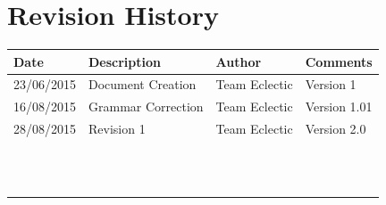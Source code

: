 \documentclass[11pt]{article}
\begin{document}


\setcounter{tocdepth}{3}
\setcounter{secnumdepth}{5}
\tableofcontents

\newpage
\section{Revision History}
\begin{table}[h]
\begin{tabular}{llll}
\textbf{Date}          & \textbf{Description}  & \textbf{Author}       & \textbf{Comments}   \\ \hline
\multicolumn{1}{|R{2cm}|}{23/06/2015} & \multicolumn{1}{L{4.5cm}|}{Document Creation} & \multicolumn{1}{l|}{Team Eclectic} & \multicolumn{1}{L{4cm}|}{Version 1} \\ \hline
\multicolumn{1}{|R{2cm}|}{16/08/2015} & \multicolumn{1}{L{4.5cm}|}{Grammar Correction} & \multicolumn{1}{l|}{Team Eclectic} & \multicolumn{1}{L{4cm}|}{Version 1.01} \\ \hline
\multicolumn{1}{|R{2cm}|}{28/08/2015} & \multicolumn{1}{L{4.5cm}|}{Revision 1} & \multicolumn{1}{l|}{Team Eclectic} & \multicolumn{1}{L{4cm}|}{Version 2.0} \\ \hline
\multicolumn{1}{|l|}{} & \multicolumn{1}{l|}{} & \multicolumn{1}{l|}{} & \multicolumn{1}{l|}{} \\ \hline
\multicolumn{1}{|l|}{} & \multicolumn{1}{l|}{} & \multicolumn{1}{l|}{} & \multicolumn{1}{l|}{} \\ \hline
\multicolumn{1}{|l|}{} & \multicolumn{1}{l|}{} & \multicolumn{1}{l|}{} & \multicolumn{1}{l|}{} \\ \hline
\multicolumn{1}{|l|}{} & \multicolumn{1}{l|}{} & \multicolumn{1}{l|}{} & \multicolumn{1}{l|}{} \\ \hline
\multicolumn{1}{|l|}{} & \multicolumn{1}{l|}{} & \multicolumn{1}{l|}{} & \multicolumn{1}{l|}{} \\ \hline
\multicolumn{1}{|l|}{} & \multicolumn{1}{l|}{} & \multicolumn{1}{l|}{} & \multicolumn{1}{l|}{} \\ \hline
\multicolumn{1}{|l|}{} & \multicolumn{1}{l|}{} & \multicolumn{1}{l|}{} & \multicolumn{1}{l|}{} \\ \hline
\multicolumn{1}{|l|}{} & \multicolumn{1}{l|}{} & \multicolumn{1}{l|}{} & \multicolumn{1}{l|}{} \\ \hline
\multicolumn{1}{|l|}{} & \multicolumn{1}{l|}{} & \multicolumn{1}{l|}{} & \multicolumn{1}{l|}{} \\ \hline
\multicolumn{1}{|l|}{} & \multicolumn{1}{l|}{} & \multicolumn{1}{l|}{} & \multicolumn{1}{l|}{} \\ \hline
\multicolumn{1}{|l|}{} & \multicolumn{1}{l|}{} & \multicolumn{1}{l|}{} & \multicolumn{1}{l|}{} \\ \hline
\multicolumn{1}{|l|}{} & \multicolumn{1}{l|}{} & \multicolumn{1}{l|}{} & \multicolumn{1}{l|}{} \\ \hline
\end{tabular}
\end{table}
\end{document}
